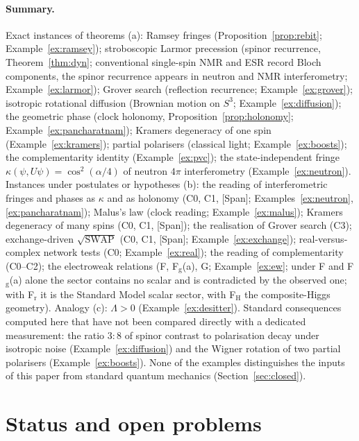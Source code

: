 \documentclass[aps,pra,onecolumn,superscriptaddress,nofootinbib,10pt]{revtex4-2}
\theoremstyle{definition}
\theoremstyle{remark}
\begin{document}
\paragraph{Summary.}  Exact instances of theorems (a): Ramsey fringes (Proposition~\ref{prop:rebit};
Example~\ref{ex:ramsey}); stroboscopic Larmor precession (spinor recurrence, Theorem~\ref{thm:dyn}; conventional single-spin NMR and
ESR record Bloch components, the spinor recurrence appears in neutron and NMR interferometry;
Example~\ref{ex:larmor}); Grover search (reflection
recurrence; Example~\ref{ex:grover}); isotropic rotational diffusion (Brownian motion on $S^3$;
Example~\ref{ex:diffusion}); the geometric phase (clock holonomy, Proposition~\ref{prop:holonomy};
Example~\ref{ex:pancharatnam}); Kramers degeneracy of one spin (Example~\ref{ex:kramers}); partial polarisers
(classical light; Example~\ref{ex:boosts}); the complementarity identity (Example~\ref{ex:pvc}); the
state-independent fringe $\kappa(\psi,U\psi)=\cos^2(\alpha/4)$ of neutron $4\pi$ interferometry
(Example~\ref{ex:neutron}).  Instances under postulates or hypotheses (b): the reading of interferometric
fringes and phases as $\kappa$ and as holonomy (C0, C1, [Span]; Examples~\ref{ex:neutron},
\ref{ex:pancharatnam}); Malus's law (clock reading; Example~\ref{ex:malus}); Kramers degeneracy of many spins
(C0, C1, [Span]); the realisation of Grover search (C3); exchange-driven $\sqrt{\mathrm{SWAP}}$ (C0, C1, [Span];
Example~\ref{ex:exchange}); real-versus-complex network tests (C0; Example~\ref{ex:real}); the reading of
complementarity (C0--C2); the electroweak relations (F, F$_{\mathrm g}$(a), G; Example~\ref{ex:ew}; under F and F$_{\mathrm g}$(a) alone the sector contains no scalar and is contradicted by the observed one; with F$_{\mathrm r}$ it is the Standard Model scalar sector, with F$_{\mathrm H}$ the composite-Higgs geometry).  Analogy (c): $\Lambda>0$
(Example~\ref{ex:desitter}).  Standard consequences computed here that have not been compared directly
with a dedicated measurement: the ratio $3:8$ of spinor contrast to polarisation decay under isotropic
noise (Example~\ref{ex:diffusion}) and the Wigner rotation of two partial polarisers
(Example~\ref{ex:boosts}).  None of the examples distinguishes the inputs of this paper from standard
quantum mechanics (Section~\ref{sec:closed}).

\section{Status and open problems}\label{sec:scope}
\end{document}
